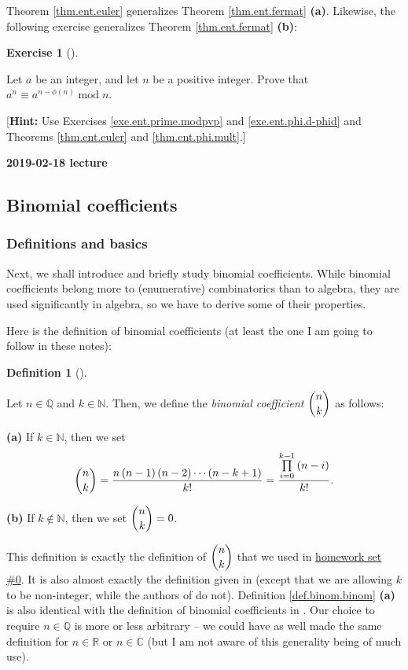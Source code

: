 \documentclass[numbers=enddot,12pt,final,onecolumn,notitlepage]{scrartcl}%
\newcounter{exer}
\numberwithin{exer}{subsection}
\theoremstyle{definition}
\newtheorem{defi}[theo]{Definition}
\newenvironment{definition}[1][]
{\begin{defi}[#1]\begin{leftbar}}
{\end{leftbar}\end{defi}}
\newtheorem{exmp}[exer]{Exercise}
\newenvironment{exercise}[1][]
{\begin{exmp}[#1]\begin{leftbar}}
{\end{leftbar}\end{exmp}}
\let\prodnonlimits\prod
\renewcommand{\prod}{\prodnonlimits\limits}
\begin{document}
Theorem \ref{thm.ent.euler} generalizes Theorem \ref{thm.ent.fermat}
\textbf{(a)}. Likewise, the following exercise generalizes Theorem
\ref{thm.ent.fermat} \textbf{(b)}:

\begin{exercise}
\label{exe.ent.euler.non-coprime}Let $a$ be an integer, and let $n$ be a
positive integer. Prove that $a^{n}\equiv a^{n-\phi\left(  n\right)
}\operatorname{mod}n$.

[\textbf{Hint:} Use Exercises \ref{exe.ent.prime.modpvp} and
\ref{exe.ent.phi.d-phid} and Theorems \ref{thm.ent.euler} and
\ref{thm.ent.phi.mult}.]
\end{exercise}

\begin{center}
\textbf{2019-02-18 lecture}
\end{center}

\subsection{Binomial coefficients}

\subsubsection{Definitions and basics}

Next, we shall introduce and briefly study binomial coefficients. While
binomial coefficients belong more to (enumerative) combinatorics than to
algebra, they are used significantly in algebra, so we have to derive some of
their properties.

Here is the definition of binomial coefficients (at least the one I am going
to follow in these notes):

\begin{definition}
\label{def.binom.binom}Let $n\in\mathbb{Q}$ and $k\in\mathbb{N}$. Then, we
define the \textit{binomial coefficient} $\dbinom{n}{k}$ as follows:

\textbf{(a)} If $k\in\mathbb{N}$, then we set
\[
\dbinom{n}{k}=\dfrac{n\left(  n-1\right)  \left(  n-2\right)  \cdots\left(
n-k+1\right)  }{k!}=\dfrac{\prod_{i=0}^{k-1}\left(  n-i\right)  }{k!}.
\]


\textbf{(b)} If $k\notin\mathbb{N}$, then we set $\dbinom{n}{k}=0$.
\end{definition}

This definition is exactly the definition of $\dbinom{n}{k}$ that we used in
\href{http://www-users.math.umn.edu/~dgrinber/19s/hw0s.pdf}{homework set \#0}.
It is also almost exactly the definition given in \cite[(5.1)]{GKP} (except
that we are allowing $k$ to be non-integer, while the authors of \cite{GKP} do
not). Definition \ref{def.binom.binom} \textbf{(a)} is also identical with the
definition of binomial coefficients in \cite{detnotes}. Our choice to require
$n\in\mathbb{Q}$ is more or less arbitrary -- we could have as well made the
same definition for $n\in\mathbb{R}$ or $n\in\mathbb{C}$ (but I am not aware
of this generality being of much use).
\end{document}
